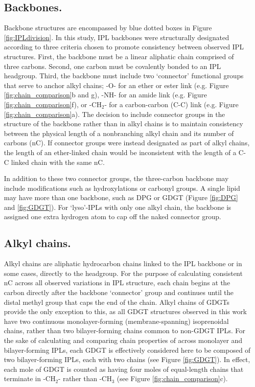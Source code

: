 \subsection{Backbones.} Backbone structures are encompassed by blue dotted boxes in Figure \ref{fig:IPLdivision}. In this study, IPL backbones were structurally designated according to three criteria chosen to promote consistency between observed IPL structures. First, the backbone must be a linear aliphatic chain comprised of three carbons. Second, one carbon must be covalently bonded to an IPL headgroup. Third, the backbone must include two `connector' functional groups that serve to anchor alkyl chains; -O- for an ether or ester link (e.g. Figure \ref{fig:chain_comparison}b and g), -NH- for an amide link (e.g. Figure \ref{fig:chain_comparison}f), or -CH$_{2}$- for a carbon-carbon (C-C) link (e.g. Figure \ref{fig:chain_comparison}a). The decision to include connector groups in the structure of the backbone rather than in alkyl chains is to maintain consistency between the physical length of a nonbranching alkyl chain and its number of carbons (nC). If connector groups were  instead designated as part of alkyl chains, the length of an ether-linked chain would be inconsistent with the length of a C-C linked chain with the same nC.

\par In addition to these two connector groups, the three-carbon backbone may include modifications such as hydroxylations or carbonyl groups. A single lipid may have more than one backbone, such as DPG or GDGT (Figure \ref{fig:DPG} and \ref{fig:GDGT}). For `lyso'-IPLs with only one alkyl chain, the backbone is assigned one extra hydrogen atom to cap off the naked connector group.

\subsection{Alkyl chains.} Alkyl chains are aliphatic hydrocarbon chains linked to the IPL backbone or in some cases, directly to the headgroup. For the purpose of calculating consistent nC across all observed variations in IPL structure, each chain begins at the carbon directly after the backbone `connector' group and continues until the distal methyl group that caps the end of the chain. Alkyl chains of GDGTs provide the only exception to this, as all GDGT structures observed in this work have two continuous monolayer-forming (membrane-spanning) isoprenoidal chains, rather than two bilayer-forming chains common to non-GDGT IPLs. For the sake of calculating and comparing chain properties of across monolayer and bilayer-forming IPLs, each GDGT is effectively considered here to be composed of two bilayer-forming IPLs, each with two chains (see Figure \ref{fig:GDGT}). In effect, each mole of GDGT is counted as having four moles of equal-length chains that terminate in -CH$_{2}$- rather than -CH$_{3}$ (see Figure \ref{fig:chain_comparison}c).


